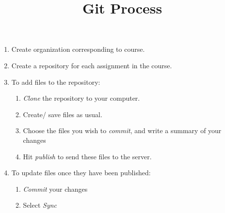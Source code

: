\documentclass[12pt]{amsart}
\title{Git Process}
\theoremstyle{definition}
\begin{document}
\pagestyle{plain}


\maketitle

\begin{enumerate}
\item Create organization corresponding to course.
\item Create a repository for each assignment in the course.
\item To add files to the repository:
\begin{enumerate}
\item \emph{Clone} the repository to your computer.
\item Create/ save files as usual.
\item Choose the files you wish to \emph{commit}, and write a summary of your changes
\item Hit \emph{publish} to send these files to the server.
\end{enumerate}
\item To update files once they have been published:
\begin{enumerate}
\item \emph{Commit} your changes
\item Select \emph{Sync}
\end{enumerate}
\end{enumerate}
\end{document}

